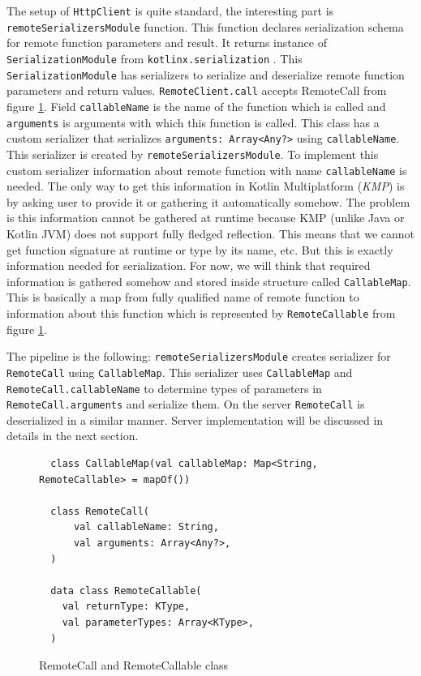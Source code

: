 \documentclass[a4paper,11pt,oneside]{article}
\newcommand{\term}[1]{\textit{#1}}
\newcommand{\kotlini}[1]{\texttt{#1}}
\begin{document}
The setup of \kotlini{HttpClient} is quite standard, the interesting part is
\kotlini{remoteSerializersModule} function. This function declares serialization schema for remote
function parameters and result. It returns instance of \kotlini{SerializationModule} from
\texttt{kotlinx.serialization} \cite{noauthor_kotlinkotlinxserialization_2026}. This
\kotlini{SerializationModule} has serializers to serialize and deserialize remote function
parameters and return values. \kotlini{RemoteClient.call} accepts RemoteCall from figure
\ref{remote_call_and_callable_class}. Field \kotlini{callableName} is the name of the function
which is called and \kotlini{arguments} is arguments with which this function is called. This class
has a custom serializer that serializes \kotlini{arguments: Array<Any?>} using
\kotlini{callableName}. This serializer is created by \kotlini{remoteSerializersModule}. To
implement this custom serializer information about remote function with name \kotlini{callableName}
is needed. The only way to get this information in Kotlin Multiplatform (\term{KMP}) is by asking
user to provide it or gathering it automatically somehow. The problem is this information cannot be
gathered at runtime because KMP (unlike Java or Kotlin JVM) does not support fully fledged
reflection. This means that we cannot get function signature at runtime or type by its name, etc.
But this is exactly information needed for serialization. For now, we will think that required
information is gathered somehow and stored inside structure called \kotlini{CallableMap}. This is
basically a map from fully qualified name of remote function to information about this function
which is represented by \kotlini{RemoteCallable} from figure \ref{remote_call_and_callable_class}.

The pipeline is the following: \kotlini{remoteSerializersModule} creates serializer for
\kotlini{RemoteCall} using \kotlini{CallableMap}. This serializer uses \kotlini{CallableMap} and
\kotlini{RemoteCall.callableName} to determine types of parameters in
\kotlini{RemoteCall.arguments} and serialize them. On the server \kotlini{RemoteCall} is
deserialized in a similar manner. Server implementation will be discussed in details in the next
section.

\begin{figure}[!h]
  \begin{verbatim}
  class CallableMap(val callableMap: Map<String, RemoteCallable> = mapOf())

  class RemoteCall(
      val callableName: String,
      val arguments: Array<Any?>,
  )

  data class RemoteCallable(
    val returnType: KType,
    val parameterTypes: Array<KType>,
  )
  \end{verbatim}
  \caption{RemoteCall and RemoteCallable class}\label{remote_call_and_callable_class}
\end{figure}
\end{document}
